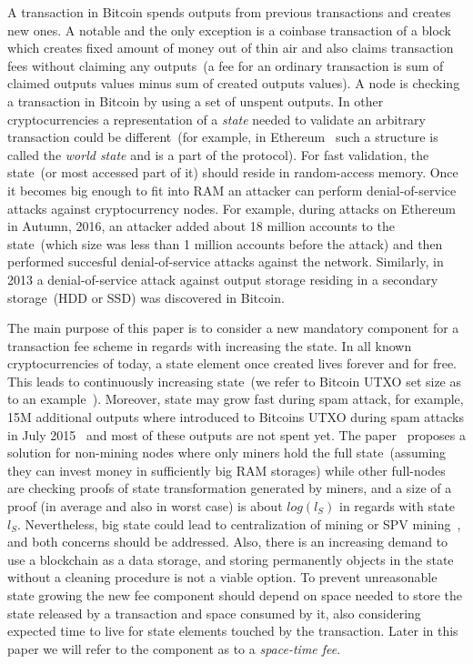 \documentclass[]{article}   %
\begin{document}
A transaction in Bitcoin spends outputs from previous transactions and creates new ones. A notable and the only exception is a coinbase transaction of a block which creates fixed amount of money out of thin air and also claims transaction fees without claiming any outputs~(a fee for an ordinary transaction is sum of claimed outputs values minus sum of created outputs values). A node is checking a transaction in Bitcoin by using a set of unspent outputs. In other cryptocurrencies a representation of a \textit{state} needed to validate an arbitrary transaction could be different~(for example, in Ethereum~\cite{ethyp} such a structure is called the \textit{world state} and is a part of the protocol).  For fast validation, the state~(or most accessed part of it) should reside in random-access memory. Once it becomes big enough to fit into RAM an attacker can perform denial-of-service attacks against cryptocurrency nodes. For example, during attacks on Ethereum in Autumn, 2016, an attacker added about 18 million accounts to the state~(which size was less than 1 million accounts before the attack) and then performed succesful denial-of-service attacks against the network. Similarly, in 2013 a denial-of-service attack against output storage residing in a secondary storage~(HDD or SSD) was discovered in Bitcoin. 


The main purpose of this paper is to consider a new mandatory component for a transaction fee scheme in regards with increasing the state. In all known cryptocurrencies of today, a state element once created lives forever and for free. This leads to continuously increasing state~(we refer to Bitcoin UTXO set size as to an example~\cite{utxoChart}). Moreover, state may grow fast during spam attack, for example, 15M additional outputs where introduced to Bitcoins UTXO during spam attacks in July 2015~\cite{bitcoin2015flood} and most of these outputs are not spent yet. The paper~\cite{} proposes a solution for non-mining nodes where only miners hold the full state~(assuming they can invest money in sufficiently big RAM storages) while other full-nodes are checking proofs of state transformation generated by miners, and a size of a proof (in average and also in worst case) is about $log(l_S)$ in regards with state $l_S$. Nevertheless, big state could lead to centralization of mining or SPV mining~\cite{spvMining}, and both concerns should be addressed. 
Also, there is an increasing demand to use a blockchain as a data storage, and storing permanently objects in the state without a cleaning procedure is not a viable option. To prevent unreasonable state growing the new fee component should depend on space needed to store the state released by a transaction and space consumed by it, also considering expected time to live for state elements touched by the transaction. Later in this paper we will refer to the component as to a \textit{space-time fee}.
\end{document}
